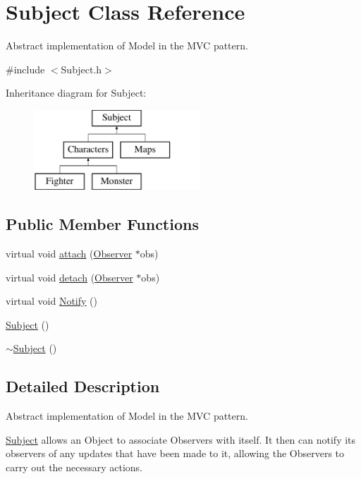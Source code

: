 \hypertarget{class_subject}{}\section{Subject Class Reference}
\label{class_subject}


Abstract implementation of Model in the M\+VC pattern.  




{\ttfamily \#include $<$Subject.\+h$>$}

Inheritance diagram for Subject\+:\begin{figure}[H]
\begin{center}
\leavevmode
\includegraphics[height=3.000000cm]{class_subject}
\end{center}
\end{figure}
\subsection*{Public Member Functions}
\begin{DoxyCompactItemize}
\item 
virtual void \hyperlink{class_subject_aec0d2f94b266d79c426b0ac454d823a5}{attach} (\hyperlink{class_observer}{Observer} $\ast$obs)
\item 
virtual void \hyperlink{class_subject_ad101324d66ad30b943e4fdc31dc16d14}{detach} (\hyperlink{class_observer}{Observer} $\ast$obs)
\item 
virtual void \hyperlink{class_subject_afdf01736ff099d286543b450d96215f1}{Notify} ()
\item 
\hyperlink{class_subject_ab468044832c824c6d6c2f46272655207}{Subject} ()
\item 
\hyperlink{class_subject_a7c4f522850f718466e5be7eb55ba1969}{$\sim$\+Subject} ()
\end{DoxyCompactItemize}


\subsection{Detailed Description}
Abstract implementation of Model in the M\+VC pattern. 

\hyperlink{class_subject}{Subject} allows an Object to associate Observers with itself. It then can notify its observers of any updates that have been made to it, allowing the Observers to carry out the necessary actions. 

